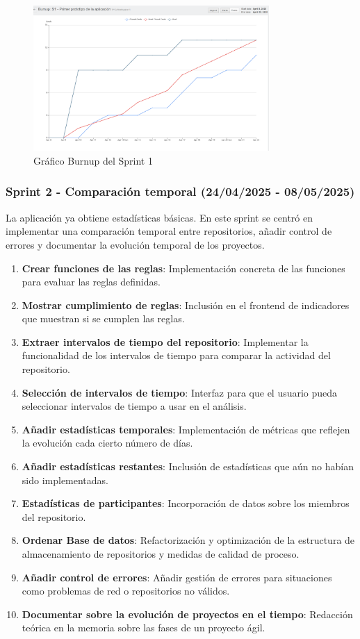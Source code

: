 \begin{figure}[H]
\centering
\includegraphics[width=0.8\textwidth]{img/BurnupS1.png}
\caption{Gráfico Burnup del Sprint 1}
\label{fig:BurnupS1}
\end{figure}

\subsubsection{Sprint 2 - Comparación temporal (24/04/2025 - 08/05/2025)}

La aplicación ya obtiene estadísticas básicas. En este sprint se centró en implementar una comparación temporal entre repositorios, añadir control de errores y documentar la evolución temporal de los proyectos.

\begin{enumerate}
\item \textbf{Crear funciones de las reglas}: Implementación concreta de las funciones para evaluar las reglas definidas.
\item \textbf{Mostrar cumplimiento de reglas}: Inclusión en el frontend de indicadores que muestran si se cumplen las reglas.
\item \textbf{Extraer intervalos de tiempo del repositorio}: Implementar la funcionalidad de los intervalos de tiempo para comparar la actividad del repositorio.
\item \textbf{Selección de intervalos de tiempo}: Interfaz para que el usuario pueda seleccionar intervalos de tiempo a usar en el análisis.
\item \textbf{Añadir estadísticas temporales}: Implementación de métricas que reflejen la evolución cada cierto número de días.
\item \textbf{Añadir estadísticas restantes}: Inclusión de estadísticas que aún no habían sido implementadas.
\item \textbf{Estadísticas de participantes}: Incorporación de datos sobre los miembros del repositorio.
\item \textbf{Ordenar Base de datos}: Refactorización y optimización de la estructura de almacenamiento de repositorios y medidas de calidad de proceso.
\item \textbf{Añadir control de errores}: Añadir gestión de errores para situaciones como problemas de red o repositorios no válidos.
\item \textbf{Documentar sobre la evolución de proyectos en el tiempo}: Redacción teórica en la memoria sobre las fases de un proyecto ágil.
\end{enumerate}

